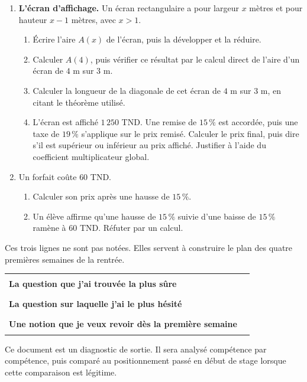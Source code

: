 \documentclass[10pt,a4paper]{article}
\begin{document}
\needspace{68mm}\par\vspace{3mm}
\begin{enumerate}
\needspace{22mm}
\item[\textbf{C1.}] \textbf{L'écran d'affichage.} Un écran rectangulaire a pour largeur $x$ mètres et pour
hauteur $x - 1$ mètres, avec $x > 1$.
\begin{enumerate}
\item Écrire l'aire $A(x)$ de l'écran, puis la développer et la réduire.
\item Calculer $A(4)$, puis vérifier ce résultat par le calcul direct de l'aire d'un écran de $4$ m sur $3$ m.
\item Calculer la longueur de la diagonale de cet écran de $4$ m sur $3$ m, en citant le théorème utilisé.
\item L'écran est affiché $1\,250$ TND. Une remise de $15\,\%$ est accordée, puis une taxe de $19\,\%$ s'applique
sur le prix remisé. Calculer le prix final, puis dire s'il est supérieur ou inférieur au prix affiché.
Justifier à l'aide du coefficient multiplicateur global.
\end{enumerate}
\par\vspace{1.2mm}
\needspace{22mm}
\item[\textbf{C2.}] Un forfait coûte $60$ TND.
\begin{enumerate}
\item Calculer son prix après une hausse de $15\,\%$.
\item Un élève affirme qu'une hausse de $15\,\%$ suivie d'une baisse de $15\,\%$ ramène à $60$ TND.
Réfuter par un calcul.
\end{enumerate}
\par\vspace{1.2mm}
\end{enumerate}
\brouillon{\dimexpr\textheight/3\relax}
\newpage
{}
\begin{methodbox}Ces trois lignes ne sont pas notées. Elles servent à construire le plan des quatre premières semaines de la rentrée.\end{methodbox}
\par\noindent\begin{tabularx}{\linewidth}{>{\bfseries}p{62mm} X}
\toprule
La question que j'ai trouvée la plus sûre & \rule{85mm}{0.32pt} \\
La question sur laquelle j'ai le plus hésité & \rule{85mm}{0.32pt} \\
Une notion que je veux revoir dès la première semaine & \rule{85mm}{0.32pt} \\
\bottomrule\end{tabularx}
\vfill
\begin{graybox}\small Ce document est un diagnostic de sortie. Il sera analysé compétence par compétence, puis comparé au positionnement passé en début de stage lorsque cette comparaison est légitime.\end{graybox}
\end{document}
